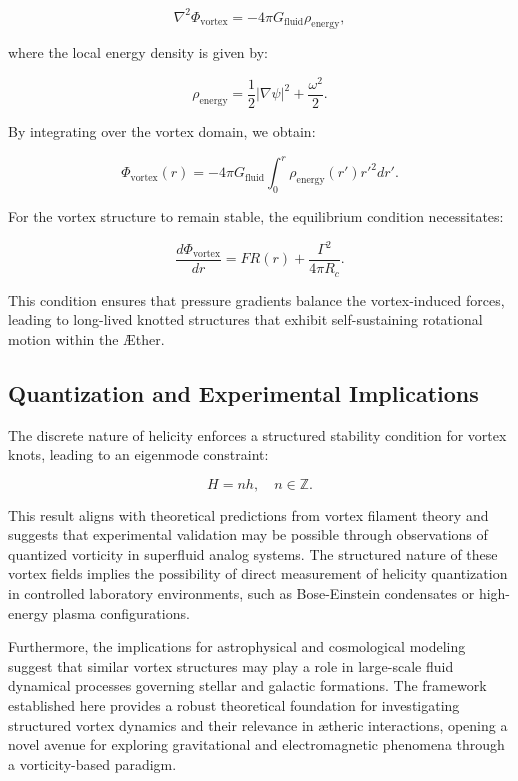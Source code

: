 \begin{equation*}
\nabla^2 \Phi_\text{vortex} = -4\pi G_\text{fluid} \rho_\text{energy},
\end{equation*}

where the local energy density is given by:

\begin{equation*}
\rho_\text{energy} = \frac{1}{2} |\nabla \psi|^2 + \frac{\omega^2}{2}.
\end{equation*}

By integrating over the vortex domain, we obtain:

\begin{equation*}
\Phi_\text{vortex}(r) = -4\pi G_\text{fluid} \int_0^r \rho_\text{energy}(r') r'^2 dr'.
\end{equation*}

For the vortex structure to remain stable, the equilibrium condition necessitates:

\begin{equation*}
\frac{d\Phi_\text{vortex}}{dr} = F R(r) + \frac{\Gamma^2}{4 \pi R_c}.
\end{equation*}

This condition ensures that pressure gradients balance the vortex-induced forces, leading to long-lived knotted structures that exhibit self-sustaining rotational motion within the Æther.

\subsection{Quantization and Experimental Implications}
The discrete nature of helicity enforces a structured stability condition for vortex knots, leading to an eigenmode constraint:

\begin{equation*}
H = n h, \quad n \in \mathbb{Z}.
\end{equation*}

This result aligns with theoretical predictions from vortex filament theory and suggests that experimental validation may be possible through observations of quantized vorticity in superfluid analog systems. The structured nature of these vortex fields implies the possibility of direct measurement of helicity quantization in controlled laboratory environments, such as Bose-Einstein condensates or high-energy plasma configurations.

Furthermore, the implications for astrophysical and cosmological modeling suggest that similar vortex structures may play a role in large-scale fluid dynamical processes governing stellar and galactic formations. The framework established here provides a robust theoretical foundation for investigating structured vortex dynamics and their relevance in ætheric interactions, opening a novel avenue for exploring gravitational and electromagnetic phenomena through a vorticity-based paradigm.
